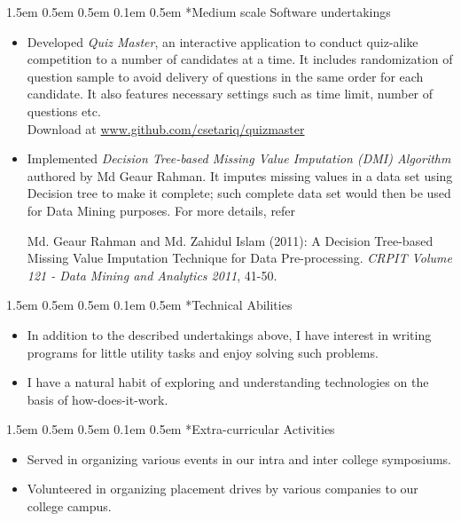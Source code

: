 \documentclass[a4paper, 10pt]{article}
\makeatletter
\renewcommand\section{\@startsection{section}{1}{\z@}%
                                  {1.5em \@plus 0.5em \@minus 0.5em}%
                                  {0.1em \@plus 0.5em}%
                                  {\normalfont\bfseries\sc}}
\makeatother
\begin{document}
\section*{Medium scale Software undertakings}
\begin{adjustwidth}{1.3em}{0pt}
\begin{itemize}
	\item Developed \emph{Quiz Master}, an interactive application to conduct quiz-alike competition to a number of candidates at a time. It includes randomization of question sample to avoid delivery of questions in the same order for each candidate. It also features necessary settings such as time limit, number of questions etc.\\
	Download at \url{www.github.com/csetariq/quizmaster}
	\item Implemented \emph{Decision Tree-based Missing Value Imputation (DMI) Algorithm} authored by Md Geaur Rahman. It imputes missing values in a data set using Decision tree to make it complete; such complete data set would then be used for Data Mining purposes. For more details, refer
	\begin{adjustwidth}{2.5em}{2.5em}
	Md. Geaur Rahman and Md. Zahidul Islam (2011): A Decision Tree-based Missing Value Imputation Technique for Data Pre-processing. \emph{CRPIT Volume 121 - Data Mining and Analytics 2011}, 41-50.
	\end{adjustwidth}
\end{itemize}
\end{adjustwidth}

\section*{Technical Abilities}
\begin{adjustwidth}{1.3em}{0pt}
\begin{itemize}
	\item In addition to the described undertakings above, I have interest in writing programs for little utility tasks and enjoy solving such problems.
	\item I have a natural habit of exploring and understanding technologies on the basis of how-does-it-work.
\end{itemize}
\end{adjustwidth}

\section*{Extra-curricular Activities}
\begin{adjustwidth}{1.3em}{0pt}
\begin{itemize}
	\item Served in organizing various events in our intra and inter college symposiums.
	\item Volunteered in organizing placement drives by various companies to our college campus.
\end{itemize}
\end{adjustwidth}
\end{document}
